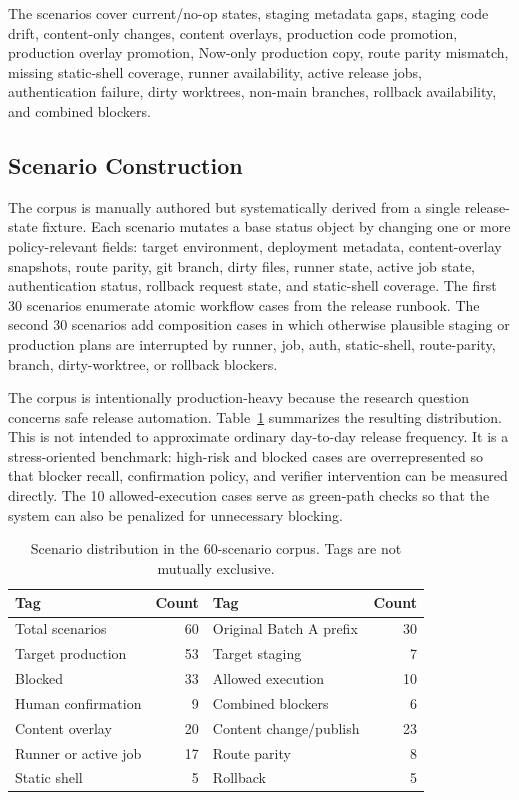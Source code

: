 \documentclass[11pt]{article}
\begin{document}
The scenarios cover current/no-op states, staging metadata gaps, staging code drift, content-only changes, content overlays, production code promotion, production overlay promotion, Now-only production copy, route parity mismatch, missing static-shell coverage, runner availability, active release jobs, authentication failure, dirty worktrees, non-main branches, rollback availability, and combined blockers.

\subsection{Scenario Construction}

The corpus is manually authored but systematically derived from a single release-state fixture. Each scenario mutates a base status object by changing one or more policy-relevant fields: target environment, deployment metadata, content-overlay snapshots, route parity, git branch, dirty files, runner state, active job state, authentication status, rollback request state, and static-shell coverage. The first 30 scenarios enumerate atomic workflow cases from the release runbook. The second 30 scenarios add composition cases in which otherwise plausible staging or production plans are interrupted by runner, job, auth, static-shell, route-parity, branch, dirty-worktree, or rollback blockers.

The corpus is intentionally production-heavy because the research question concerns safe release automation. Table~\ref{tab:scenario-distribution} summarizes the resulting distribution. This is not intended to approximate ordinary day-to-day release frequency. It is a stress-oriented benchmark: high-risk and blocked cases are overrepresented so that blocker recall, confirmation policy, and verifier intervention can be measured directly. The 10 allowed-execution cases serve as green-path checks so that the system can also be penalized for unnecessary blocking.

\begin{table}[t]
\centering
\small
\begin{tabular}{@{}lr@{\qquad}lr@{}}
\toprule
Tag & Count & Tag & Count \\
\midrule
Total scenarios & 60 & Original Batch A prefix & 30 \\
Target production & 53 & Target staging & 7 \\
Blocked & 33 & Allowed execution & 10 \\
Human confirmation & 9 & Combined blockers & 6 \\
Content overlay & 20 & Content change/publish & 23 \\
Runner or active job & 17 & Route parity & 8 \\
Static shell & 5 & Rollback & 5 \\
\bottomrule
\end{tabular}
\caption{Scenario distribution in the 60-scenario corpus. Tags are not mutually exclusive.}
\label{tab:scenario-distribution}
\end{table}
\end{document}

